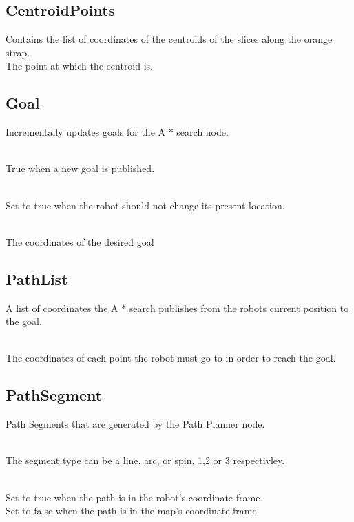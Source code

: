 \subsection{CentroidPoints}
Contains the list of coordinates of the centroids of the slices along the orange strap.
\\
\indent {}
\indent The point at which the centroid is.

\subsection{Goal}
Incrementally updates goals for the A $\ast$ search node.

\\
\indent True when a new goal is published.

\\
\indent Set to true when the robot should not change its present location.

\\
\indent The coordinates of the desired goal

\subsection{PathList}
A list of coordinates the A $\ast$ search publishes from the robots current position to the goal.

\\
\indent The coordinates of each point the robot must go to in order to reach the goal.

\subsection{PathSegment}
Path Segments that are generated by the Path Planner node.

\\
\indent The segment type can be a line, arc, or spin, 1,2 or 3 respectivley.

\\
\indent Set to true when the path is in the robot's coordinate frame.\\
\indent Set to false when the path is in the map's coordinate frame.


